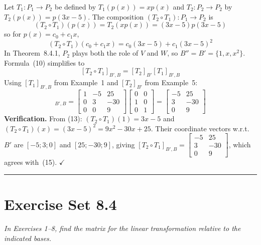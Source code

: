 \documentclass{article}
\begin{document}
Let $T_1 : P_1 \to P_2$ be defined by $T_1(p(x)) = xp(x)$ and
$T_2 : P_2 \to P_2$ by $T_2(p(x)) = p(3x-5)$.
The composition $(T_2 \circ T_1) : P_1 \to P_2$ is
\[
  (T_2 \circ T_1)(p(x)) = T_2(xp(x)) = (3x-5)p(3x-5)
\]
so for $p(x) = c_0 + c_1 x$,
\[
  (T_2 \circ T_1)(c_0+c_1 x) = c_0(3x-5) + c_1(3x-5)^2 \tag{13}
\]
In Theorem~8.4.1, $P_2$ plays both the role of $V$ and $W$, so $B'' = B' = \{1,x,x^2\}$.
Formula~(10) simplifies to
\[
  [T_2\circ T_1]_{B',B} = [T_2]_{B'}[T_1]_{B',B} \tag{14}
\]
Using $[T_1]_{B',B}$ from Example~1 and $[T_2]_{B'}$ from Example~5:
\begin{equation}
  [T_2\circ T_1]_{B',B}
  = \begin{bmatrix}1&-5&25\\0&3&-30\\0&0&9\end{bmatrix}
    \begin{bmatrix}0&0\\1&0\\0&1\end{bmatrix}
  = \begin{bmatrix}-5&25\\3&-30\\0&9\end{bmatrix} \tag{15}
\end{equation}
\textbf{Verification.} From (13): $(T_2\circ T_1)(1) = 3x-5$ and $(T_2\circ T_1)(x) = (3x-5)^2 = 9x^2-30x+25$.
Their coordinate vectors w.r.t.\ $B'$ are $[-5;3;0]$ and $[25;-30;9]$, giving
$[T_2\circ T_1]_{B',B} = \begin{bmatrix}-5&25\\3&-30\\0&9\end{bmatrix}$, which agrees with~(15). $\checkmark$

\vspace{3mm}
\noindent\rule{\linewidth}{0.5pt}

\section*{Exercise Set 8.4}

\noindent\textit{In Exercises 1--8, find the matrix for the linear transformation relative
to the indicated bases.}
\end{document}
